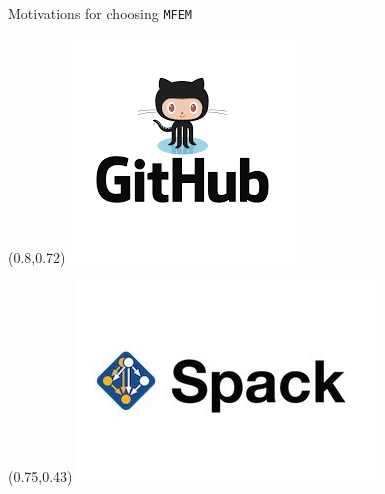 \documentclass{beamer}
\begin{document}
\begin{frame}[fragile]{Motivations for choosing \texttt{MFEM}}
\begin{textblock}{.19}(0.8,0.72)
    \includegraphics[trim = 0cm 1.5cm 0cm 1.cm,clip,width=\textwidth]{img/github.png}
\end{textblock}

\begin{textblock}{.24}(0.75,0.43)
    \includegraphics[trim = 0cm 1.5cm 0cm 1.5cm,clip,width=\textwidth]{img/spack.jpg}
\end{textblock}

\end{frame}
\end{document}
